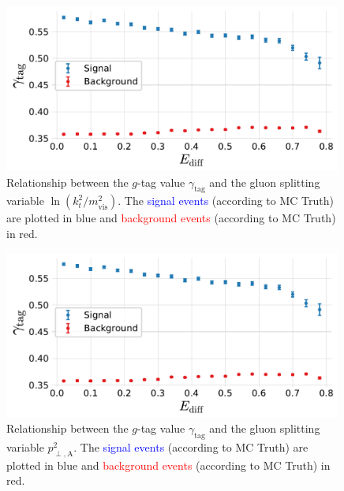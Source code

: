 \begin{figure}
  \centerfloat
  \includegraphics[width=0.99\textwidth, trim=0 0 0 0, clip, page=7]{figures/quarks/gtag-g_splitting_gtag_errorbar-down_sample=1.00-ML_vars=vertex-selection=b-ejet_min=4-n_iter_RS_lgb=99-n_iter_RS_xgb=9-cdot_cut=0.90-version=19-njet=4.pdf}
  \caption[Relationship Between the $g$-Tag Value $\gamma_\mathrm{tag}$ and the Gluon Splitting Variable $\ln \left( k_t^2 / m_\mathrm{vis}^2 \right)$]
          {Relationship between the $g$-tag value $\gamma_\mathrm{tag}$ and the gluon splitting variable $\ln \left( k_t^2 / m_\mathrm{vis}^2 \right)$. The \textcolor{blue}{signal events} (according to MC Truth) are plotted in blue and \textcolor{red}{background events} (according to MC Truth) in red. 
          } 
  \label{fig:q:gtag_gluon_splitting_variable_ln_kt_m_vis}
\end{figure}
\begin{figure}
  \centerfloat
  \includegraphics[width=0.99\textwidth, trim=0 0 0 0, clip, page=8]{figures/quarks/gtag-g_splitting_gtag_errorbar-down_sample=1.00-ML_vars=vertex-selection=b-ejet_min=4-n_iter_RS_lgb=99-n_iter_RS_xgb=9-cdot_cut=0.90-version=19-njet=4.pdf}
  \caption[Relationship Between the $g$-Tag Value $\gamma_\mathrm{tag}$ and the Gluon Splitting Variable $p^2_{\perp,\mathrm{A}}$]
          {Relationship between the $g$-tag value $\gamma_\mathrm{tag}$ and the gluon splitting variable $p^2_{\perp,\mathrm{A}}$. The \textcolor{blue}{signal events} (according to MC Truth) are plotted in blue and \textcolor{red}{background events} (according to MC Truth) in red. 
          } 
  \label{fig:q:gtag_gluon_splitting_variable_pt_antenna}
\end{figure}












